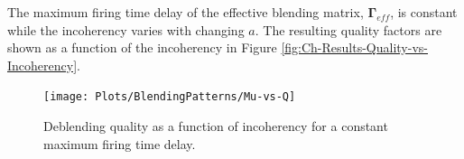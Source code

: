 The maximum firing time delay of the effective blending matrix, $\mathbf{\Gamma}_{eff}$, is constant while the incoherency  varies with changing $a$. The resulting quality factors are shown as a function of the incoherency in Figure \ref{fig:Ch-Results-Quality-vs-Incoherency}.

\begin{figure}
	\centering
	\texttt{[image: Plots/BlendingPatterns/Mu-vs-Q]}
	\caption{Deblending quality as a function of incoherency for a constant maximum firing time delay.}
	\label{fig:Ch-Results-Quality-vs-Incoherency1}
\end{figure}




























